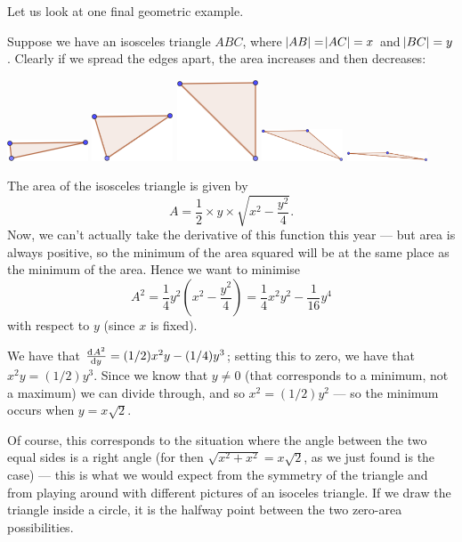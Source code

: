 Let us look at one final geometric example.
\begin{ex}
  Suppose we have an isosceles triangle $ ABC $, where $ \abs{AB} = \abs{AC} = x $ and $ \abs{BC} = y $. Clearly
  if we spread the edges apart, the area increases and then decreases:
  \begin{center}
    \includegraphics[width=0.18\textwidth]{isos1}
    \includegraphics[width=0.18\textwidth]{isos2}
    \includegraphics[width=0.18\textwidth]{isos3}
    \includegraphics[width=0.18\textwidth]{isos4}
    \includegraphics[width=0.18\textwidth]{isos5}
  \end{center}

  The area of the isosceles triangle is given by
  \begin{displaymath}
    A = \frac{1}{2} \times y \times \sqrt{x^2 - \frac{y^2}{4}}.
  \end{displaymath}
  Now, we can't actually take the derivative of this function this year --- but area is always positive, so the minimum of the area squared
  will be at the same place as the minimum of the area. Hence we want to minimise
  \begin{displaymath}
    A^2 = \frac{1}{4}y^2\left(x^2 - \frac{y^2}{4}\right) = \frac{1}{4} x^2 y^2 - \frac{1}{16}y^4
  \end{displaymath}
  with respect to $ y $ (since $ x $ is fixed).

  We have that $ \od{A^2}{y} = (1/2) x^2 y - (1/4)y^3 $; setting this to zero, we have that $ x^2 y = (1/2)y^3 $. Since we know
  that $ y \neq 0 $ (that corresponds to a minimum, not a maximum) we can divide through, and so $ x^2 = (1/2) y^2 $ --- so the
  minimum occurs when $ y = x\sqrt{2} $.

  Of course, this corresponds to the situation where the angle between the two equal sides is a right angle (for then $ \sqrt{x^2 + x^2} = x\sqrt{2} $, as
  we just found is the case) --- this is what we would expect from the symmetry of the triangle and from playing around with different pictures of
  an isoceles triangle. If we draw the triangle inside a circle, it is the halfway point between the two zero-area possibilities.
\end{ex}


